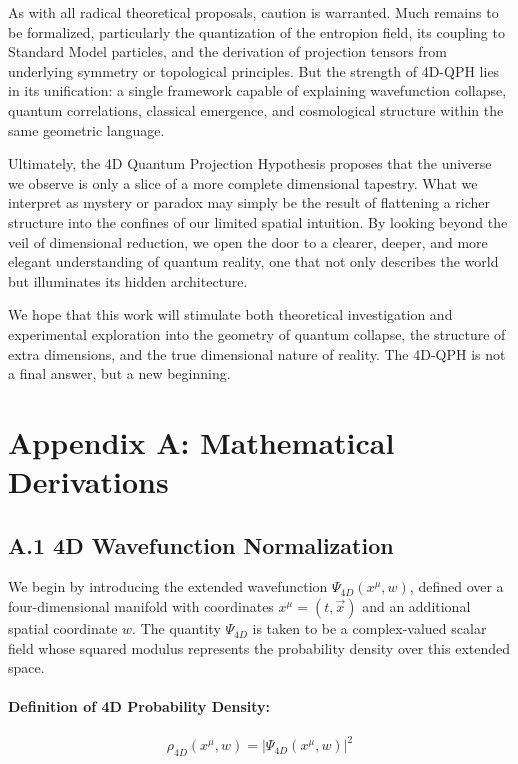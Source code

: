 \documentclass[12pt]{article}
\begin{document}
As with all radical theoretical proposals, caution is warranted. Much remains to be formalized, particularly the quantization of the entropion field, its coupling to Standard Model particles, and the derivation of projection tensors from underlying symmetry or topological principles. But the strength of 4D-QPH lies in its unification: a single framework capable of explaining wavefunction collapse, quantum correlations, classical emergence, and cosmological structure within the same geometric language.

Ultimately, the 4D Quantum Projection Hypothesis proposes that the universe we observe is only a slice of a more complete dimensional tapestry. What we interpret as mystery or paradox may simply be the result of flattening a richer structure into the confines of our limited spatial intuition. By looking beyond the veil of dimensional reduction, we open the door to a clearer, deeper, and more elegant understanding of quantum reality, one that not only describes the world but illuminates its hidden architecture.

We hope that this work will stimulate both theoretical investigation and experimental exploration into the geometry of quantum collapse, the structure of extra dimensions, and the true dimensional nature of reality. The 4D-QPH is not a final answer, but a new beginning.


\appendix
\section*{Appendix A: Mathematical Derivations}

\subsection*{A.1 \quad 4D Wavefunction Normalization}
\label{eq:A1}

We begin by introducing the extended wavefunction \(\Psi_{4D}(x^\mu, w)\), defined over a four-dimensional manifold with coordinates \(x^\mu = (t, \vec{x})\) and an additional spatial coordinate \(w\). The quantity \(\Psi_{4D}\) is taken to be a complex-valued scalar field whose squared modulus represents the probability density over this extended space.

\vspace{1em}
\noindent
\paragraph{Definition of 4D Probability Density:}
\begin{equation}
\rho_{4D}(x^\mu, w) = \left| \Psi_{4D}(x^\mu, w) \right|^2
\label{eq:A1_density4d}
\end{equation}
\end{document}
